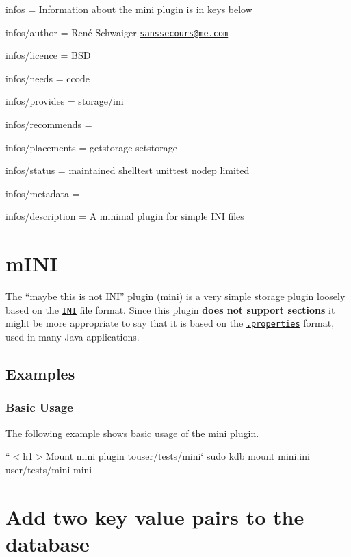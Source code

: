 
\begin{DoxyItemize}
\item infos = Information about the mini plugin is in keys below
\item infos/author = René Schwaiger \href{mailto:sanssecours@me.com}{\tt sanssecours@me.\+com}
\item infos/licence = B\+SD
\item infos/needs = ccode
\item infos/provides = storage/ini
\item infos/recommends =
\item infos/placements = getstorage setstorage
\item infos/status = maintained shelltest unittest nodep limited
\item infos/metadata =
\item infos/description = A minimal plugin for simple I\+NI files
\end{DoxyItemize}\hypertarget{md_src_plugins_mini_README_src_plugins_mini_README_md}{}\section{m\+I\+NI}\label{md_src_plugins_mini_README_src_plugins_mini_README_md}
The “maybe this is not I\+N\+I” plugin ({\ttfamily mini}) is a very simple storage plugin loosely based on the \href{https://en.wikipedia.org/wiki/INI_file}{\tt I\+NI} file format. Since this plugin {\bfseries does not support sections} it might be more appropriate to say that it is based on the \href{https://en.wikipedia.org/wiki/.properties}{\tt .properties} format, used in many Java applications.

\subsection*{Examples}

\subsubsection*{Basic Usage}

The following example shows basic usage of the {\ttfamily mini} plugin.

``{\ttfamily  $<$h1$>$Mount mini plugin to}user/tests/mini` sudo kdb mount mini.\+ini user/tests/mini mini

\section*{Add two key value pairs to the database}

